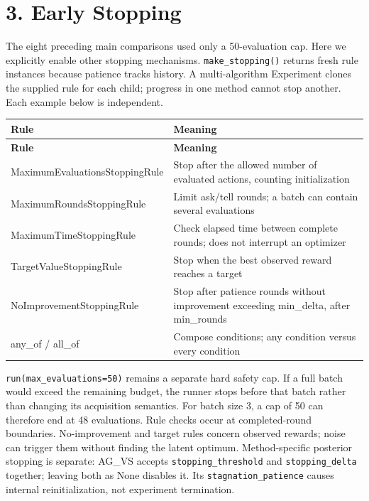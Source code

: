 \documentclass[10pt,a4paper]{article}
\begin{document}
\clearpage
{}
\section*{3. Early Stopping}

The eight preceding main comparisons used only a 50-evaluation cap. Here we explicitly enable other stopping mechanisms. \texttt{make\_\allowbreak{}stopping()} returns fresh rule instances because patience tracks history. A multi-algorithm Experiment clones the supplied rule for each child; progress in one method cannot stop another. Each example below is independent.


{\small
\begin{longtable}{@{}>{\raggedright\arraybackslash}p{0.5000\dimexpr\linewidth-2\tabcolsep\relax}>{\raggedright\arraybackslash}p{0.5000\dimexpr\linewidth-2\tabcolsep\relax}@{}}
\toprule
\textbf{Rule} & \textbf{Meaning} \\
\midrule\endfirsthead
\toprule
\textbf{Rule} & \textbf{Meaning} \\
\midrule\endhead
MaximumEvaluationsStoppingRule & Stop after the allowed number of evaluated actions,\allowbreak{} counting initialization \\
MaximumRoundsStoppingRule & Limit ask/tell rounds; a batch can contain several evaluations \\
MaximumTimeStoppingRule & Check elapsed time between complete rounds; does not interrupt an optimizer \\
TargetValueStoppingRule & Stop when the best observed reward reaches a target \\
NoImprovementStoppingRule & Stop after patience rounds without improvement exceeding min\_\allowbreak{}delta,\allowbreak{} after min\_\allowbreak{}rounds \\
any\_\allowbreak{}of / all\_\allowbreak{}of & Compose conditions; any condition versus every condition \\
\bottomrule
\end{longtable}
}

\texttt{run(max\_\allowbreak{}evaluations=\allowbreak{}50)} remains a separate hard safety cap. If a full batch would exceed the remaining budget,\allowbreak{} the runner stops before that batch rather than changing its acquisition semantics. For batch size 3,\allowbreak{} a cap of 50 can therefore end at 48 evaluations. Rule checks occur at completed-round boundaries. No-improvement and target rules concern observed rewards; noise can trigger them without finding the latent optimum. Method-specific posterior stopping is separate: AG\_\allowbreak{}VS accepts \texttt{stopping\_\allowbreak{}threshold} and \texttt{stopping\_\allowbreak{}delta} together; leaving both as None disables it. Its \texttt{stagnation\_\allowbreak{}patience} causes internal reinitialization,\allowbreak{} not experiment termination.
\end{document}
